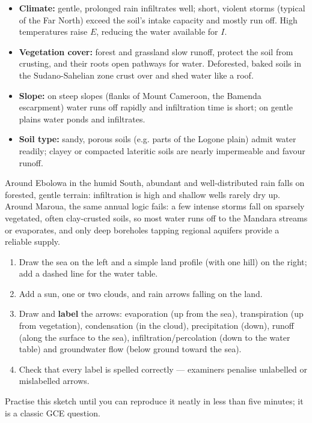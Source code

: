 \documentclass[11pt]{article}
\begin{document}
\begin{itemize}
\item \textbf{Climate:} gentle, prolonged rain infiltrates well; short, violent storms (typical of the Far North) exceed the soil's intake capacity and mostly run off. High temperatures raise $E$, reducing the water available for $I$.
\item \textbf{Vegetation cover:} forest and grassland slow runoff, protect the soil from crusting, and their roots open pathways for water. Deforested, baked soils in the Sudano-Sahelian zone crust over and shed water like a roof.
\item \textbf{Slope:} on steep slopes (flanks of Mount Cameroon, the Bamenda escarpment) water runs off rapidly and infiltration time is short; on gentle plains water ponds and infiltrates.
\item \textbf{Soil type:} sandy, porous soils (e.g. parts of the Logone plain) admit water readily; clayey or compacted lateritic soils are nearly impermeable and favour runoff.
\end{itemize}

\begin{exemplebox}
Around Ebolowa in the humid South, abundant and well-distributed rain falls on forested, gentle terrain: infiltration is high and shallow wells rarely dry up. Around Maroua, the same annual logic fails: a few intense storms fall on sparsely vegetated, often clay-crusted soils, so most water runs off to the Mandara streams or evaporates, and only deep boreholes tapping regional aquifers provide a reliable supply.
\end{exemplebox}

\begin{methode}
\begin{enumerate}
\item Draw the sea on the left and a simple land profile (with one hill) on the right; add a dashed line for the water table.
\item Add a sun, one or two clouds, and rain arrows falling on the land.
\item Draw and \textbf{label} the arrows: evaporation (up from the sea), transpiration (up from vegetation), condensation (in the cloud), precipitation (down), runoff (along the surface to the sea), infiltration/percolation (down to the water table) and groundwater flow (below ground toward the sea).
\item Check that every label is spelled correctly --- examiners penalise unlabelled or mislabelled arrows.
\end{enumerate}
Practise this sketch until you can reproduce it neatly in less than five minutes; it is a classic GCE question.
\end{methode}
\end{document}

